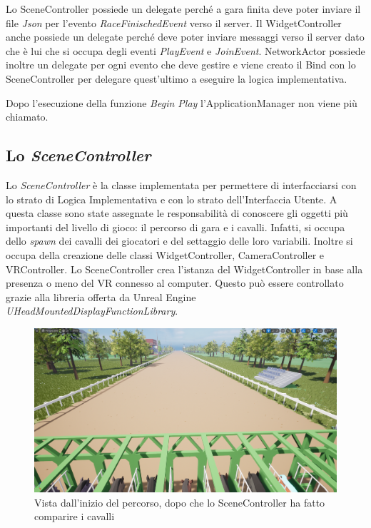     Lo SceneController possiede un delegate perché a gara finita deve poter inviare il file \textit{Json} per l'evento \textit{RaceFinischedEvent} verso il server.
    Il WidgetController anche possiede un delegate perché deve poter inviare messaggi verso il server dato che è lui che si occupa degli eventi \textit{PlayEvent} e \textit{JoinEvent}.
    NetworkActor possiede inoltre un delegate per ogni evento che deve gestire e viene creato il Bind con lo SceneController per delegare quest'ultimo a eseguire la logica implementativa.

    Dopo l'esecuzione della funzione \textit{Begin Play} l'ApplicationManager non viene più chiamato.

    \subsection{Lo \textit{SceneController}}

    Lo \textit{SceneController} è la classe implementata per permettere di interfacciarsi con lo strato di Logica Implementativa e con lo strato dell'Interfaccia Utente.
    A questa classe sono state assegnate le responsabilità di conoscere gli oggetti più importanti del livello di gioco: il percorso di gara e i cavalli. 
    Infatti, si occupa dello \textit{spawn} dei cavalli dei giocatori e del settaggio delle loro variabili.
    Inoltre si occupa della creazione delle classi WidgetController, CameraController e VRController.
    Lo SceneController crea l'istanza del WidgetController in base alla presenza o meno del VR connesso al computer.
    Questo può essere controllato grazie alla libreria offerta da Unreal Engine \textit{UHeadMountedDisplayFunctionLibrary}.

    \begin{figure}[!ht]
        \centering
        \includegraphics[width=12cm]{figure/HorseView2Cropped.png}
        \caption{Vista dall'inizio del percorso, dopo che lo SceneController ha fatto comparire i cavalli}
    \end{figure}


